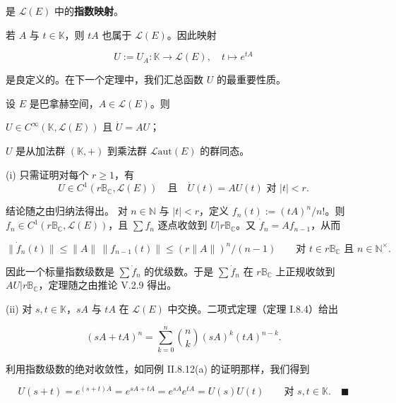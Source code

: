 是 $ \mathcal{L}(E) $ 中的\textbf{指数映射}。

若 $ A $ 与 $ t \in \mathbb{K} $，则 $ tA $ 也属于 $ \mathcal{L}(E) $。因此映射

\begin{equation}
U := U_{A} : \mathbb{K} \to \mathcal{L}(E) , \quad t \mapsto e^{tA}\tag{1.7}
\end{equation}

是良定义的。在下一个定理中，我们汇总函数 $ U $ 的最重要性质。

\begin{theorem}

设 $ E $ 是巴拿赫空间，$ A \in \mathcal{L}(E) $。则

\begin{subitems}
\item

$ U \in C^{\infty}(\mathbb{K}, \mathcal{L}(E)) $ 且 $ \dot{U} = AU $；

\item

$ U $ 是从加法群 $ (\mathbb{K}, +) $ 到乘法群 $ \mathcal{L}\mathrm{aut}(E) $ 的群同态。

\proofhead
(i) 只需证明对每个 $ r \ge 1 $，有
\[
U \in C^{1}(r\mathbb{B}_{\mathbb{C}}, \mathcal{L}(E)) \quad \text{且} \quad \dot{U}(t) = AU(t) \text{ 对 } |t| < r .
\]

结论随之由归纳法得出。
对 $ n \in \mathbb{N} $ 与 $ |t| < r $，定义 $ f_{n}(t) := (tA)^{n}/n! $。则 $ f_{n} \in C^{1}(r\mathbb{B}_{\mathbb{C}}, \mathcal{L}(E)) $，且 $ \sum f_{n} $ 逐点收敛到 $ U|r\mathbb{B}_{\mathbb{C}} $。又 $ \dot{f}_{n} = Af_{n-1} $，从而

\[
\|\dot{f}_{n}(t)\| \le \|A\|\,\|f_{n-1}(t)\| \le (r\|A\|)^{n}/(n-1) \qquad \text{对 } t \in r\mathbb{B}_{\mathbb{C}} \text{ 且 } n \in \mathbb{N}^{\times} .
\]

因此一个标量指数级数是 $ \sum \dot{f}_{n} $ 的优级数。于是 $ \sum \dot{f}_{n} $ 在 $ r\mathbb{B}_{\mathbb{C}} $ 上正规收敛到 $ AU|r\mathbb{B}_{\mathbb{C}} $，定理随之由推论 V.2.9 得出。

\end{subitems}

(ii) 对 $ s, t \in \mathbb{K} $，$ sA $ 与 $ tA $ 在 $ \mathcal{L}(E) $ 中交换。二项式定理（定理 I.8.4）给出

\[
(sA + tA)^{n} = \sum_{k=0}^{n}\binom{n}{k}(sA)^{k}(tA)^{n-k} .
\]

利用指数级数的绝对收敛性，如同例 II.8.12(a) 的证明那样，我们得到

\[
U(s + t) = e^{(s+t)A} = e^{sA+tA} = e^{sA}e^{tA} = U(s)U(t) \qquad \text{对 } s, t \in \mathbb{K} .\quad\blacksquare
\]
\end{theorem}

